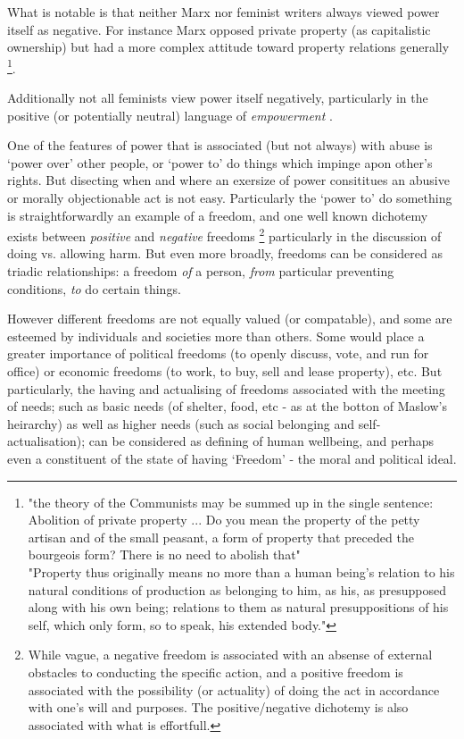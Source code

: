 What is notable is that neither Marx nor feminist writers always viewed power itself as negative. For instance Marx opposed private property (as capitalistic ownership) but had a more complex attitude toward property relations generally \footnote{"the theory of the Communists may be summed up in the single sentence: Abolition of private property ... Do you mean the property of the petty artisan and of the small peasant, a form of property that preceded the bourgeois form? There is no need to abolish that"\cite{MarxGutenberg}\\"Property thus originally means no more than a human being's relation to his natural conditions of production as belonging to him, as his, as presupposed along with his own being; relations to them as natural presuppositions of his self, which only form, so to speak, his extended body."\cite{marx_capital_I}}.

Additionally not all feminists view power itself negatively, particularly in the positive (or potentially neutral) language of \textit{empowerment} \cite{doi:10.1111/j.1527-2001.1998.tb01350.x}.

One of the features of power that is associated (but not always) with abuse is `power over' other people, or `power to' do things which impinge apon other's rights.\cite{doi:10.1111/j.1527-2001.1998.tb01350.x}
But disecting when and where an exersize of power consititues an abusive or morally objectionable act is not easy.
Particularly the `power to' do something is straightforwardly an example of a freedom, and one well known dichotemy exists between \textit{positive} and \textit{negative} freedoms
\footnote{While vague, a negative freedom is associated with an absense of external obstacles to conducting the specific action, and a positive freedom is associated with the possibility (or actuality) of doing the act in accordance with one's will and purposes. The positive/negative dichotemy is also associated with what is effortfull.\cite{}} particularly in the discussion of doing vs. allowing harm.
But even more broadly, freedoms can be considered as triadic relationships: a freedom \textit{of} a person, \textit{from} particular preventing conditions, \textit{to} do certain things.\cite{Negative_and_Positive_Freedom}

However different freedoms are not equally valued (or compatable), and some are esteemed by individuals and societies more than others.
Some would place a greater importance of political freedoms (to openly discuss, vote, and run for office) or economic freedoms (to work, to buy, sell and lease property), etc.
But particularly, the having and actualising of freedoms associated with the meeting of needs; such as basic needs (of shelter, food, etc - as at the botton of Maslow's heirarchy) as well as higher needs (such as social belonging and self-actualisation); can be considered as defining of human wellbeing, and perhaps even a constituent of the state of having `Freedom' - the moral and political ideal.

